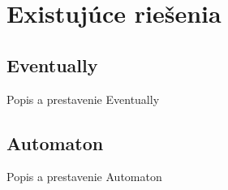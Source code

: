 \section{Existujúce riešenia}
\noindent 

\subsection{Eventually}
\noindent Popis a prestavenie Eventually

\subsection{Automaton}
\noindent Popis a prestavenie Automaton